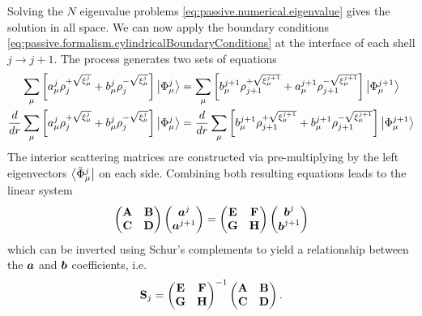 Solving the $N$ eigenvalue problems \eqref{eq:passive.numerical.eigenvalue} gives
the solution in all space. We can now apply the boundary conditions \eqref{eq:passive.formalism.cylindricalBoundaryConditions}
at the interface of each shell $j\rightarrow j+1$. The process generates two sets of equations
  \begin{subequations}
  \label{eq:passive.numerical.boundaryCondition}
  \begin{align}
   \sum_\mu\left[a_\mu^j\rho_j^{+\sqrt{\xi_\mu^j}}+b_\mu^j\rho_j^{-\sqrt{\xi_\mu^j}}\right]\Ket{\Phi_\mu^j}
   &=
   \sum_\mu\left[b_\mu^{j+1}\rho_{j+1}^{+\sqrt{\xi_\mu^{j+1}}}+a_\mu^{j+1}\rho_{j+1}^{-\sqrt{\xi_\mu^{j+1}}}\right]\Ket{\Phi_\mu^{j+1}}	\\
   \frac{d}{dr}\sum_\mu\left[a_\mu^j\rho_j^{+\sqrt{\xi_\mu^j}}+b_\mu^j\rho_j^{-\sqrt{\xi_\mu^j}}\right]\Ket{\Phi_\mu^j}
   &=
   \frac{d}{dr}\sum_\mu\left[b_\mu^{j+1}\rho_{j+1}^{+\sqrt{\xi_\mu^{j+1}}}+b_\mu^{j+1}\rho_{j+1}^{-\sqrt{\xi_\mu^{j+1}}}\right]\Ket{\Phi_\mu^{j+1}}
  \end{align}
  \end{subequations}
The interior scattering matrices
are constructed via pre-multiplying by the left eigenvectors $\Bra{\tilde{\Phi}_\mu^j}$ on each side. 
Combining both resulting equations leads to the linear system 
  \begin{equation}
    \begin{pmatrix}\mathbf{A} & \mathbf{B} \\ \mathbf{C} & \mathbf{D} \end{pmatrix} \begin{pmatrix} \boldsymbol{a}^j \\ \boldsymbol{a}^{j+1}\end{pmatrix}
    =
    \begin{pmatrix}\mathbf{E} & \mathbf{F} \\ \mathbf{G} & \mathbf{H} \end{pmatrix} \begin{pmatrix} \boldsymbol{b}^j \\ \boldsymbol{b}^{j+1}\end{pmatrix}
  \end{equation}
which can be inverted using Schur's complements \cite[p.~123]{MEY2001} to yield a relationship between the 
$\boldsymbol{a}$ and $\boldsymbol{b}$ coefficients, i.e.
  \begin{equation}
   \mathbf{S}_j = \begin{pmatrix}\mathbf{E} & \mathbf{F} \\ \mathbf{G} & \mathbf{H} \end{pmatrix}^{-1}\begin{pmatrix}\mathbf{A} & \mathbf{B} \\ \mathbf{C} & \mathbf{D} \end{pmatrix}.
  \end{equation}
